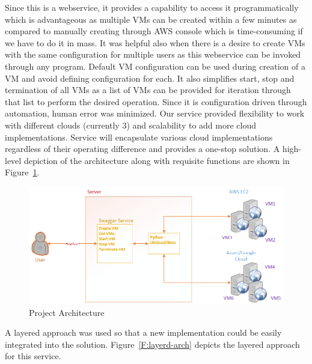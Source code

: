 Since this is a webservice, it provides a capability to access it
programmatically which is advantageous as multiple VMs can be created within a
few minutes as compared to manually creating through AWS console which is
time-consuming if we have to do it in mass. It was helpful also when there is a
desire to create VMs with the same configuration for multiple users as this
webservice can be invoked through any program. Default VM configuration can be
used during creation of a VM and avoid defining configuration for each. It also
simplifies start, stop and termination of all VMs as a list of VMs can be
provided for iteration through that list to perform the desired operation. 
Since it is configuration driven through automation, human error was minimized.
Our service provided flexibility to work with different clouds (currently 3)
and
scalability to add more cloud implementations. Service will encapsulate various
cloud implementations regardless of their operating difference and provides a
one-stop solution.
A high-level depiction of the architecture along with requisite functions are
shown in
Figure~\ref{F:arch}.

\begin{figure}[!ht]
  \centering
  \includegraphics[width=\columnwidth]{images/proj-arch.png}
  \caption{Project Architecture}\label{F:arch}
\end{figure}

A layered approach was used so that a new implementation could be easily
integrated into
the solution. Figure~\ref{F:layerd-arch} depicts the layered approach for this
service.

